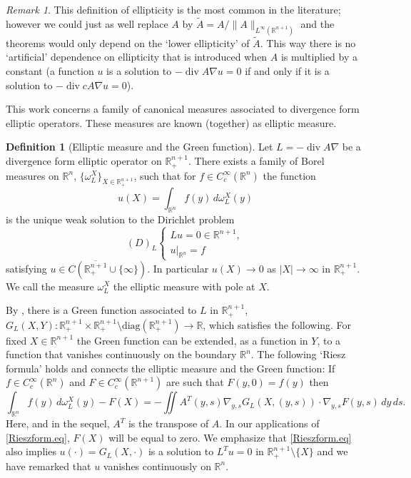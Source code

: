 \documentclass[11pt, a4paper,leqno]{amsart}
\theoremstyle{plain}
\theoremstyle{definition}
\newtheorem{definition}[equation]{Definition}
\theoremstyle{remark}
\newtheorem{remark}[equation]{Remark}
\numberwithin{equation}{section}
\newcommand{\re}{\mathbb{R}}
\newcommand{\rn}{\mathbb{R}^n}
\newcommand{\ree}{\mathbb{R}^{n+1}}
\newcommand{\hm}{\omega}
\def\div{\mathop{\operatorname{div}}\nolimits}
\begin{document}
\begin{remark}
This definition of ellipticity is the most common in the literature; however we could just as well replace $A$ by $\widetilde{A} = A/\|A\|_{L^\infty(\ree)}$ and the theorems would only depend on the `lower ellipticity' of $\widetilde{A}$. This way there is no `artificial' dependence on ellipticity that is introduced when $A$ is multiplied by a constant (a function $u$ is a solution to $-\div A \nabla u = 0$ if and only if it is a solution to $-\div cA \nabla u = 0$).
\end{remark}

This work concerns a family of canonical measures associated to divergence form elliptic operators. These measures are known (together) as elliptic measure.

\begin{definition}[Elliptic measure and the Green function]\label{def:Green}
Let $L = -\div A \nabla$ be a divergence form elliptic operator on $\ree_+$. There exists a family of Borel measures on $\rn$, $\{\hm^X_L\}_{X \in \ree_+}$, such that for $f \in C_c^\infty(\rn)$ the function
\[u(X) = \int_{\rn} f(y) \, d\hm_L^X(y)\]
is the unique weak solution to the Dirichlet problem
\[(D)_L \begin{cases}
Lu = 0 \in \ree, \\
u|_{\rn} = f
\end{cases}\]
satisfying $u \in C(\overline{\ree_+} \cup \{\infty\})$. In particular $u(X) \to 0$ as $|X| \to \infty$ in $\ree_+$. We call the measure $\hm^X_L$ the elliptic measure with pole at $X$.

By \cite[Lemma 2.25]{HMT}, there is a Green function associated to $L$ in $\ree_+$, $G_L(X,Y): \ree_+ \times \ree_+ \setminus  \text{diag}(\ree_+) \to \re$, which satisfies the following. For fixed $X \in \ree$ the Green function can be extended, as a function in $Y$, to a function that vanishes continuously on the boundary $\rn$. The following `Riesz formula' holds and connects the elliptic measure and the Green function: If $f \in C_c^\infty(\rn)$ and $F \in C_c^\infty(\ree)$ are such that $F(y,0) = f(y)$ then
\begin{equation}\label{Rieszform.eq}
\int_{\rn} f(y) \, d\hm_L^X(y) - F(X) = - \iint A^T(y,s)\nabla_{y,s}G_L(X,(y,s)) \cdot \nabla_{y,s} F(y,s) \, dy \, ds.
\end{equation}
Here, and in the sequel, $A^T$ is the transpose of $A$. In our applications of \eqref{Rieszform.eq}, $F(X)$ will be equal to zero. We emphasize that \eqref{Rieszform.eq} also implies $u(\cdot) = G_L(X, \cdot)$ is a solution to $L^T u = 0$ in $\ree_+ \setminus \{X\}$ and we have remarked that $u$ vanishes continuously on $\rn$.
\end{definition}
\end{document}
